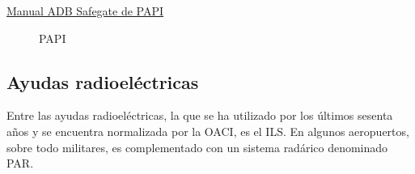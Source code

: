\href{https://adbsafegate.com/documents/2116/en/manual-voltage-powered-papi}{Manual ADB Safegate de PAPI}


\begin{figure}[!htb]
  \centering
  \caption{PAPI}
  \label{fig:06.papi}
\end{figure}



\subsection{Ayudas radioeléctricas}
\label{sec:06.03.ayudas.radioelectricas}

Entre las ayudas radioeléctricas, la que se ha utilizado por los últimos sesenta años y se encuentra
normalizada por la OACI, es el ILS. En algunos aeropuertos, sobre todo militares, es complementado
con un sistema radárico denominado PAR.

